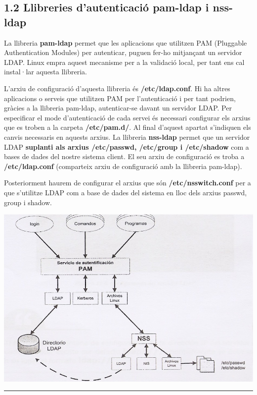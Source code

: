 \documentclass[
  12 pt,
  a4paper,
]{article}
\begin{document}
\subsection{1.2 Llibreries d'autenticació pam-ldap i
nss-ldap}\label{llibreries-dautenticaciuxf3-pam-ldap-i-nss-ldap}

La llibreria \textbf{pam-ldap} permet que les aplicacions que utilitzen
PAM (Pluggable Authentication Modules) per autenticar, puguen fer-ho
mitjançant un servidor LDAP. Linux empra aquest mecanisme per a la
validació local, per tant ens cal instal·lar aquesta llibreria.

L'arxiu de configuració d'aquesta llibreria és \textbf{/etc/ldap.conf}.
Hi ha altres aplicacions o serveis que utilitzen PAM per l'autenticació
i per tant podrien, gràcies a la llibreria pam-ldap, autenticar-se
davant un servidor LDAP. Per especificar el mode d'autenticació de cada
servei és necessari configurar els arxius que es troben a la carpeta
\textbf{/etc/pam.d/}. Al final d'aquest apartat s'indiquen els canvis
necessaris en aquests arxius. La llibreria \textbf{nss-ldap} permet que
un servidor LDAP \textbf{suplanti als arxius /etc/passwd, /etc/group i
/etc/shadow} com a bases de dades del nostre sistema client. El seu
arxiu de configuració es troba a \textbf{/etc/ldap.conf} (comparteix
arxiu de configuració amb la llibreria pam-ldap).

Posteriorment haurem de configurar el arxius que són
\textbf{/etc/nsswitch.conf} per a que s'utilitze LDAP com a base de
dades del sistema en lloc dels arxius passwd, group i shadow.

\includegraphics{png/pam.png}

\begin{center}\rule{0.5\linewidth}{0.5pt}\end{center}
\end{document}
